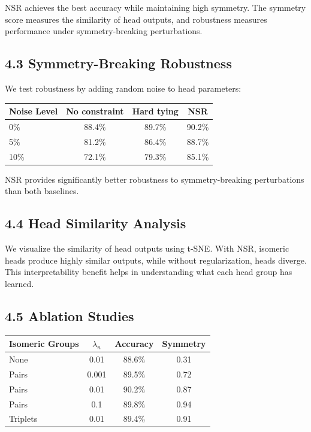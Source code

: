 \documentclass[12pt]{article}
\begin{document}
NSR achieves the best accuracy while maintaining high symmetry. The symmetry score measures the similarity of head outputs, and robustness measures performance under symmetry-breaking perturbations.

\subsection{4.3 Symmetry-Breaking Robustness}

We test robustness by adding random noise to head parameters:

\begin{center}
\begin{tabular}{|l|c|c|c|}
\hline
\textbf{Noise Level} & \textbf{No constraint} & \textbf{Hard tying} & \textbf{NSR} \\
\hline
0\% & 88.4\% & 89.7\% & 90.2\% \\
5\% & 81.2\% & 86.4\% & 88.7\% \\
10\% & 72.1\% & 79.3\% & 85.1\% \\
\hline
\end{tabular}
\end{center}

NSR provides significantly better robustness to symmetry-breaking perturbations than both baselines.

\subsection{4.4 Head Similarity Analysis}

We visualize the similarity of head outputs using t-SNE. With NSR, isomeric heads produce highly similar outputs, while without regularization, heads diverge. This interpretability benefit helps in understanding what each head group has learned.

\subsection{4.5 Ablation Studies}

\begin{center}
\begin{tabular}{|l|c|c|c|}
\hline
\textbf{Isomeric Groups} & \textbf{$\lambda_n$} & \textbf{Accuracy} & \textbf{Symmetry} \\
\hline
None & 0.01 & 88.6\% & 0.31 \\
Pairs & 0.001 & 89.5\% & 0.72 \\
Pairs & 0.01 & 90.2\% & 0.87 \\
Pairs & 0.1 & 89.8\% & 0.94 \\
Triplets & 0.01 & 89.4\% & 0.91 \\
\hline
\end{tabular}
\end{center}
\end{document}

